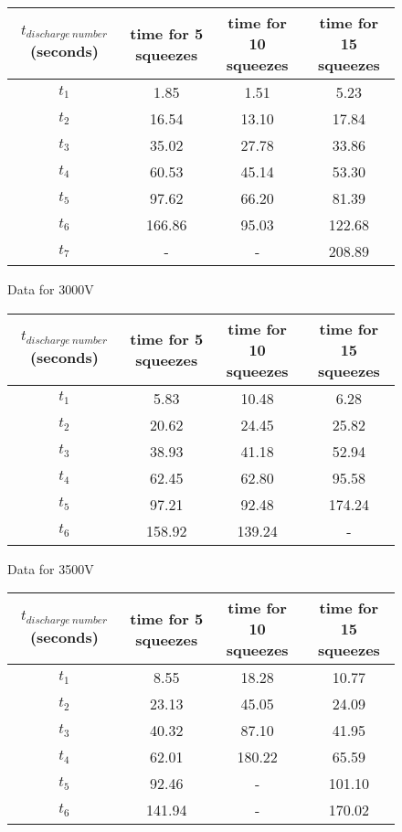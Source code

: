 \documentclass[10pt,a4paper]{article}
\begin{document}
{ \begin{center}
	\begin{figure} [H]
		\advance\leftskip-2cm
		\begin{tabular}{|c |c| c|c|} \hline
			$t_{discharge\ number}$ (seconds) &  time for 5 squeezes & time for 10 squeezes & time for 15 squeezes \\ [0.5ex] 
			\hline
			$t_1$ & 1.85 & 1.51 &5.23\\ 
			\hline
			$t_2$  & 16.54 &13.10  &17.84 \\
			\hline
			$t_3$ & 35.02 & 27.78&33.86 \\
			\hline
			$t_4$ & 60.53 & 45.14& 53.30\\
			\hline
			$t_5$ & 97.62 & 66.20 &81.39\\
			\hline
			$t_6$ & 166.86 & 95.03 & 122.68\\
			\hline
			$t_7$ & - & - & 208.89\\
			\hline
		\end{tabular}
		\caption{Data for 3000V}
	\end{figure}
\end{center}

 \begin{center}
	\begin{figure} [H]
		\advance\leftskip-2cm
		\begin{tabular}{|c |c| c|c|} \hline
			$t_{discharge\ number}$ (seconds) &  time for 5 squeezes & time for 10 squeezes & time for 15 squeezes \\ [0.5ex] 
			\hline
			$t_1$ & 5.83 & 10.48 &6.28\\ 
			\hline
			$t_2$  & 20.62&24.45  &25.82 \\
			\hline
			$t_3$ & 38.93 & 41.18& 52.94\\
			\hline
			$t_4$ & 62.45 & 62.80& 95.58\\
			\hline
			$t_5$ &97.21 & 92.48 &174.24\\
			\hline
			$t_6$ & 158.92 & 139.24& -\\
			\hline
			
		\end{tabular}
		\caption{Data for 3500V}
	\end{figure}
\end{center}

 \begin{center}
	\begin{figure} [H]
		\advance\leftskip-2cm
		\begin{tabular}{|c |c| c|c|} \hline
			$t_{discharge\ number}$ (seconds) &  time for 5 squeezes & time for 10 squeezes & time for 15 squeezes \\ [0.5ex] 
			\hline
			$t_1$ & 8.55 & 18.28 &10.77\\ 
			\hline
			$t_2$  & 23.13&45.05 &24.09 \\
			\hline
			$t_3$ & 40.32 & 87.10& 41.95\\
			\hline
			$t_4$ & 62.01 & 180.22& 65.59\\
			\hline
			$t_5$ &92.46 & - &101.10\\
			\hline
			$t_6$ & 141.94 & -& 170.02\\
			\hline
			

\end{tabular}
\end{figure}
\end{center}}
\end{document}
